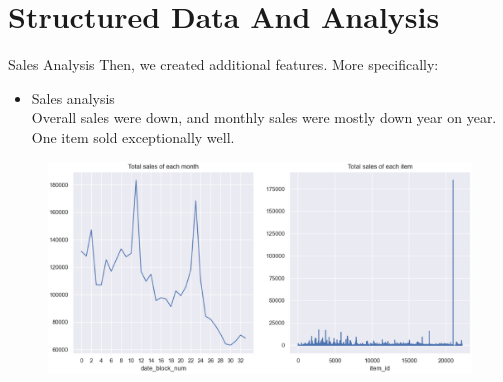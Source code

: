 \documentclass[
 size=14pt,
 paper=smartboard,  %
 mode=present, 		%
 display=slides, 	%
 style=tuliplab,  	%
 pauseslide,
 fleqn,leqno]{powerdot}
\begin{document}

\section{Structured Data And Analysis} 



\begin{slide}{Sales Analysis}
  Then, we created additional features. More specifically:
\begin{itemize}
  \item  Sales analysis\\
  Overall sales were down, and monthly sales were mostly down year on year.
One item sold exceptionally well.

\end{itemize}
\begin{figure}[htbp]
  \centering
  \begin{minipage}[t]{0.28\textwidth}
    \centering
    \centerline{\includegraphics[width=3\textwidth]{logos/sale.eps}}
    \vspace{-1.0em}
  \end{minipage}
\end{figure}

\end{slide}
\end{document}
